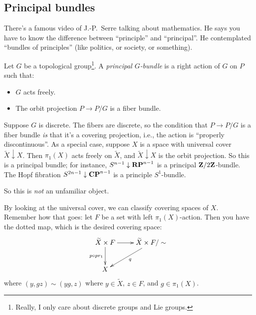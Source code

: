 \subsection{Principal bundles}
There's a famous video of J.-P.~Serre talking about mathematics. He says you have to know the difference between ``principle'' and ``principal''. He contemplated ``bundles of principles'' (like politics, or society, or something).
\begin{definition}
    Let $G$ be a topological group\footnote{Really, I only care about discrete groups and Lie groups.}. A \emph{principal $G$-bundle} is a right action of $G$ on $P$ such that:
    \begin{itemize}
	\item $G$ acts freely.
	\item The orbit projection $P\to P/G$ is a fiber bundle.
    \end{itemize}
\end{definition}
\begin{example}
    Suppose $G$ is discrete. The fibers are discrete, so the condition that $P\to P/G$ is a fiber bundle \emph{is} that it's a covering projection, i.e., the action is ``properly discontinuous''.
    As a special case, suppose $X$ is a space with universal cover $\widetilde{X}\downarrow X$. Then $\pi_1(X)$ acts freely on $\widetilde{X}$, and $\widetilde{X}\downarrow X$ is the orbit projection.
    So this is a principal bundle; for instance, $S^{n-1}\downarrow\mathbf{RP}^{n-1}$ is a principal $\mathbf Z/2\mathbf Z$-bundle. The Hopf fibration $S^{2n-1}\downarrow \mathbf{CP}^{n-1}$ is a principle $S^1$-bundle.
\end{example}
So this is \emph{not} an unfamiliar object.

By looking at the universal cover, we can classify covering spaces of $X$. Remember how that goes: let $F$ be a set with left $\pi_1(X)$-action. Then you have the dotted map, which is the desired covering space:
\begin{equation*}
    \xymatrix{
	\widetilde{X}\times F\ar[r]\ar[d]_{p\circ pr_1} & \widetilde{X}\times F/\sim\ar[dl]^q\\
	X & 
    }
\end{equation*}
where $(y,gz)\sim (yg,z)$ where $y\in\widetilde{X}$, $z\in F$, and $g\in\pi_1(X)$.

